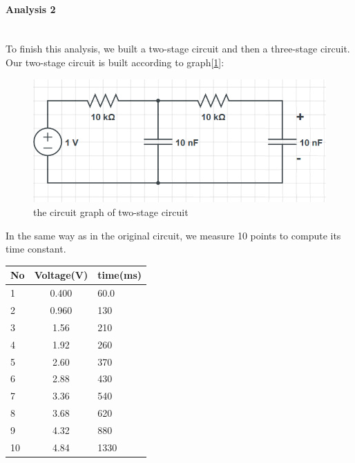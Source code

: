\paragraph{Analysis 2}\hfill
\\
\phantom{ } To finish this analysis, we built a two-stage circuit and then a three-stage circuit. Our two-stage circuit is built according to graph[\ref{fig:2.3}]:\\
\begin{figure}[htbp]
	\centering %
	\includegraphics[width=\linewidth]{images/2_3.PNG} %
	\caption{the circuit graph of two-stage circuit} %
	\label{fig:2.3} %
\end{figure}
\phantom{ } In the same way as in the original circuit, we measure 10 points to compute its time constant.
\begin{table}[htbp]\centering
	\renewcommand\arraystretch{1.5}
	\begin{tabular}{lcl}
		\toprule
		No		&Voltage(V)	&time(ms)	\\
		\midrule
		1		&0.400		&60.0		\\
		 
		2		&0.960		&130		\\
		 
		3		&1.56		&210		\\
		 
		4		&1.92		&260		\\
		 
		5		&2.60		&370		\\
		 
		6		&2.88		&430		\\
		 
		7		&3.36		&540		\\
		 
		8		&3.68		&620		\\
		 
		9		&4.32		&880		\\
		 
		10		&4.84		&1330		\\
		\bottomrule
	\end{tabular}
\end{table}
